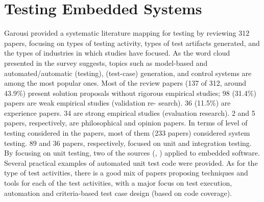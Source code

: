 \section{Testing Embedded Systems}
Garousi \etal \cite{DBLP:journals/infsof/GarousiFKY18} provided a systematic literature mapping for \es testing by reviewing 312 papers, focusing on types of testing activity, types of test artifacts generated, and the types of industries in which studies have focused. As the word cloud presented in the survey suggests, topics such as model-based and automated/automatic (testing), (test-case) generation, and control systems are among the most popular ones. Most of the review papers (137 of 312, around 43.9\%) present solution proposals without rigorous empirical studies; 98 (31.4\%) papers are weak empirical studies (validation re-
search). 36 (11.5\%) are experience papers. 34 are strong empirical studies (evaluation research). 2 and 5 papers, respectively, are philosophical and opinion papers.
In terms of level of testing considered in the papers, most of them (233 papers) considered system testing. 89 and 36 papers, respectively, focused on unit and integration testing. By focusing on unit testing, two of the sources (\cite{4428578}, \cite{DBLP:conf/isese/GuanOA06}) applied \tdd to embedded software. Several practical examples of automated unit test code were provided.
As for the type of test activities, there is a good mix of papers proposing techniques and tools for each of the test activities, with a major focus on test execution, automation and criteria-based test case design (\eg based on code coverage).


\cite{DBLP:journals/software/GarousiFKY18}


